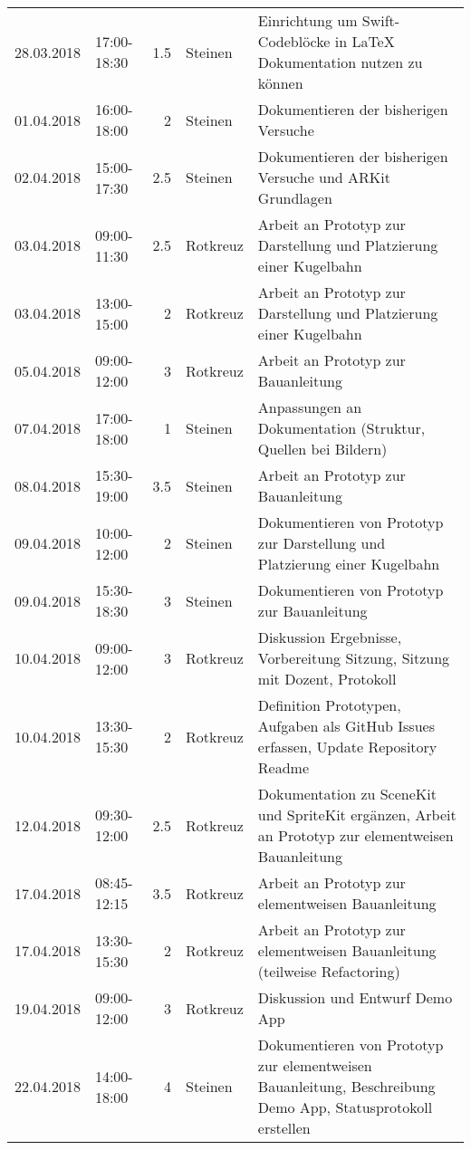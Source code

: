\begin{longtable}{llrlp{7cm}}
	28.03.2018 & 17:00-18:30 & 1.5    & Steinen & Einrichtung um Swift-Codeblöcke in LaTeX Dokumentation nutzen zu können \\
	01.04.2018 & 16:00-18:00 & 2      & Steinen & Dokumentieren der bisherigen Versuche \\
	02.04.2018 & 15:00-17:30 & 2.5    & Steinen & Dokumentieren der bisherigen Versuche und ARKit Grundlagen \\
	03.04.2018 & 09:00-11:30 & 2.5    & Rotkreuz & Arbeit an Prototyp zur Darstellung und Platzierung einer Kugelbahn \\
	03.04.2018 & 13:00-15:00 & 2      & Rotkreuz & Arbeit an Prototyp zur Darstellung und Platzierung einer Kugelbahn \\
	05.04.2018 & 09:00-12:00 & 3      & Rotkreuz & Arbeit an Prototyp zur Bauanleitung \\
	07.04.2018 & 17:00-18:00 & 1      & Steinen & Anpassungen an Dokumentation (Struktur, Quellen bei Bildern) \\
	08.04.2018 & 15:30-19:00 & 3.5    & Steinen & Arbeit an Prototyp zur Bauanleitung \\
	09.04.2018 & 10:00-12:00 & 2      & Steinen & Dokumentieren von Prototyp zur Darstellung und Platzierung einer Kugelbahn \\
	09.04.2018 & 15:30-18:30 & 3      & Steinen & Dokumentieren von Prototyp zur Bauanleitung \\
	10.04.2018 & 09:00-12:00 & 3      & Rotkreuz & Diskussion Ergebnisse, Vorbereitung Sitzung, Sitzung mit Dozent, Protokoll \\
	10.04.2018 & 13:30-15:30 & 2      & Rotkreuz & Definition Prototypen, Aufgaben als GitHub Issues erfassen, Update Repository Readme \\
	12.04.2018 & 09:30-12:00 & 2.5    & Rotkreuz & Dokumentation zu SceneKit und SpriteKit ergänzen, Arbeit an Prototyp zur elementweisen Bauanleitung \\
	17.04.2018 & 08:45-12:15 & 3.5    & Rotkreuz & Arbeit an Prototyp zur elementweisen Bauanleitung \\
	17.04.2018 & 13:30-15:30 & 2      & Rotkreuz & Arbeit an Prototyp zur elementweisen Bauanleitung (teilweise Refactoring) \\
	19.04.2018 & 09:00-12:00 & 3      & Rotkreuz & Diskussion und Entwurf Demo App \\
	22.04.2018 & 14:00-18:00 & 4      & Steinen & Dokumentieren von Prototyp zur elementweisen Bauanleitung, Beschreibung Demo App, Statusprotokoll erstellen \\

\end{longtable}
